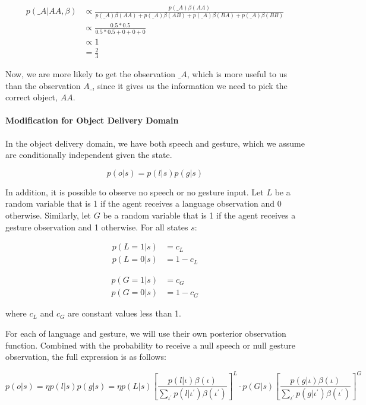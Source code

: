 \documentclass{article}
\begin{document}
\begin{align*}
	p(\_A|AA, \beta) &\propto \frac{ p(\_A)\beta(AA) }{ p(\_A)\beta(AA) + p(\_A)\beta(AB) + p(\_A)\beta(BA) + p(\_A)\beta(BB)} \\
	&\propto \frac{0.5 * 0.5}{0.5 * 0.5 + 0 + 0 + 0} \\
	&\propto 1 \\
	&= \frac{2}{3}
\end{align*}
 
Now, we are more likely to get the observation $\_A$, which is more useful to us than the observation $A\_$, since it gives us the information we need to pick the correct object, $AA$. 

\paragraph{Modification for Object Delivery Domain}


In the object delivery domain, we have both speech and gesture, which we assume are conditionally independent given the state. 

$$p(o|s) = p(l|s)p(g|s)$$

In addition, it is possible to observe no speech or no gesture input. Let $L$ be a random variable that is 1 if the agent receives a language observation and 0 otherwise. Similarly, let $G$ be a random variable that is 1 if the agent receives a gesture observation and 1 otherwise. For all states $s$: 

\begin{align*}
	p(L = 1 | s) &= c_L \\
	p(L = 0 | s) &= 1 - c_L 
\end{align*}

\begin{align*}
	p(G = 1 | s) &= c_G \\
	p(G = 0 | s) &= 1 - c_G 
\end{align*}

where $c_L$ and $c_G$ are constant values less than 1. 

For each of language and gesture, we will use their own posterior observation function. Combined with the probability to receive a null speech or null gesture observation, the full expression is as follows: 



$$p(o|s) = \eta p(l|s) p(g|s) = \eta p(L|s) \left[ \frac{p(l|\iota) \beta(\iota)}{\sum_{\iota^\prime} p(l|\iota^\prime)\beta(\iota^\prime)} \right] ^ L \cdot p(G|s) \left[ \frac{p(g|\iota) \beta(\iota)}{\sum_{\iota^\prime} p(g|\iota^\prime)\beta(\iota^\prime)} \right]^G$$
\end{document}

